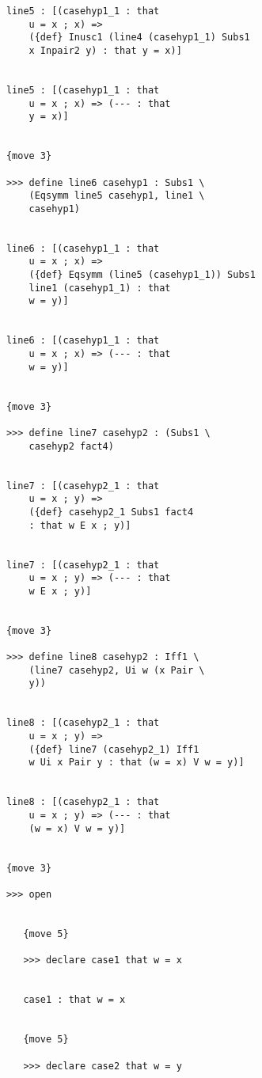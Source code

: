 \documentclass[12pt]{article}
\begin{document}
\begin{verbatim}
            line5 : [(casehyp1_1 : that 
                u = x ; x) => 
                ({def} Inusc1 (line4 (casehyp1_1) Subs1 
                x Inpair2 y) : that y = x)]


            line5 : [(casehyp1_1 : that 
                u = x ; x) => (--- : that 
                y = x)]


            {move 3}

            >>> define line6 casehyp1 : Subs1 \
                (Eqsymm line5 casehyp1, line1 \
                casehyp1)


            line6 : [(casehyp1_1 : that 
                u = x ; x) => 
                ({def} Eqsymm (line5 (casehyp1_1)) Subs1 
                line1 (casehyp1_1) : that 
                w = y)]


            line6 : [(casehyp1_1 : that 
                u = x ; x) => (--- : that 
                w = y)]


            {move 3}

            >>> define line7 casehyp2 : (Subs1 \
                casehyp2 fact4)


            line7 : [(casehyp2_1 : that 
                u = x ; y) => 
                ({def} casehyp2_1 Subs1 fact4 
                : that w E x ; y)]


            line7 : [(casehyp2_1 : that 
                u = x ; y) => (--- : that 
                w E x ; y)]


            {move 3}

            >>> define line8 casehyp2 : Iff1 \
                (line7 casehyp2, Ui w (x Pair \
                y))


            line8 : [(casehyp2_1 : that 
                u = x ; y) => 
                ({def} line7 (casehyp2_1) Iff1 
                w Ui x Pair y : that (w = x) V w = y)]


            line8 : [(casehyp2_1 : that 
                u = x ; y) => (--- : that 
                (w = x) V w = y)]


            {move 3}

            >>> open


               {move 5}

               >>> declare case1 that w = x


               case1 : that w = x


               {move 5}

               >>> declare case2 that w = y



\end{verbatim}
\end{document}
